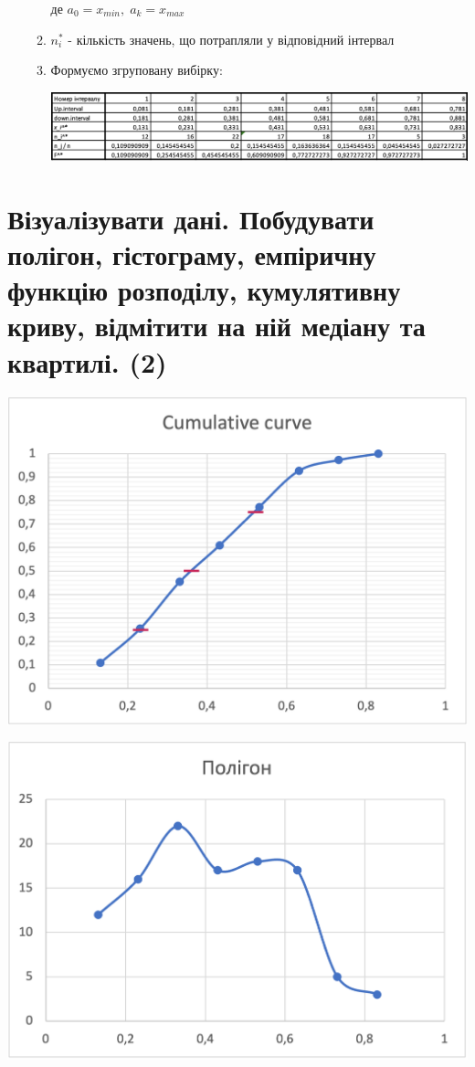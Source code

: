 \documentclass[14pt]{extarticle}
\begin{document}
\begin{enumerate}
\begin{enumerate}
де $a_{0} = x_{min} ,\; a_{k} = x_{max}$

\item $n_i^* $ - кількість значень, що потрапляли у відповідний інтервал

\item Формуємо згруповану вибірку:

\includegraphics[width=\textwidth]{zvit1-0}

\end{enumerate}


\end{enumerate}

\section{Візуалізувати дані. Побудувати полігон, гістограму, емпіричну функцію розподілу, кумулятивну криву, відмітити на ній медіану та квартилі. (2)}

\includegraphics[width=\textwidth/2]{zvit1-1}

\includegraphics[width=\textwidth/2]{zvit1-2}
\end{document}
